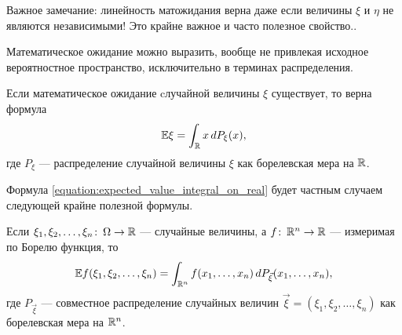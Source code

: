 \documentclass[../main.tex]{subfiles}
\begin{document}
Важное замечание: линейность матожидания верна даже если величины $ \xi $ и $ \eta $ не являются независимыми! Это крайне важное и часто полезное свойство..

Математическое ожидание можно выразить, вообще не привлекая исходное вероятностное пространство, исключительно в терминах распределения.
\begin{prop}
 Если математическое ожидание cлучайной величины $ \xi $ существует, то верна формула
 \begin{align}
  \label{equation:expected_value_integral_on_real}
  \mathbb E\xi = \int_{\mathbb{R}} x\,dP_{\xi}(x),
 \end{align} где $ P_\xi $ --- распределение случайной величины $ \xi $ как борелевская мера на $ \mathbb{R} $.
\end{prop}
Формула \eqref{equation:expected_value_integral_on_real} будет частным случаем следующей крайне полезной формулы.
\begin{prop}
 Если $ \xi_1, \xi_2, \ldots, \xi_n \colon\, \Omega \to \mathbb{R} $ --- случайные величины, а $ f \colon\, \mathbb{R}^{n}\to\mathbb{R} $ --- измеримая по Борелю функция, то
 \begin{align}
  \label{equation:expected_value_of_function}
  \mathbb E f(\xi_1, \xi_2, \ldots, \xi_n) = \int_{\mathbb{R}^{n}} f(x_1, \ldots, x_n) \,d P_{\vec\xi}(x_1, \ldots, x_n),
 \end{align} где $ P_{\vec\xi} $ --- совместное распределение случайных величин $ \vec\xi = (\xi_1, \xi_2, \ldots, \xi_n) $ как борелевская мера на $ \mathbb{R}^{n} $.
\end{prop}
\end{document}
